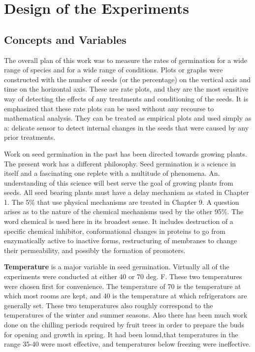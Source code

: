\chapter{Design of the Experiments}

\section{Concepts and Variables}

The overall plan of this work was to measure the rates of germination for a wide
range of species and for a wide range of conditions. Plots or graphs were constructed
with the number of seeds (or the percentage) on the vertical axis and time on the
horizontal axis. These are rate plots, and they are the most sensitive way of detecting
the effects of any treatments and conditioning of the seeds. It is emphasized that these
rate plots can be used without any recourse to mathematical analysis. They can be
treated as empirical plots and used simply as a: delicate sensor to detect internal
changes in the seeds that were caused by any prior treatments.

Work on seed germination in the past has been directed towards growing
plants. The present work has a different philosophy. Seed germination is a science in
itself and a fascinating one replete with a multitude of phenomena. An. understanding
of this science will best serve the goal of growing plants from seeds.
All seed bearing plants must have a delay mechanism as stated in Chapter 1.
The 5\% that use physical mechanisms are treated in Chapter 9. A question arises as
to the nature of the chemical mechanisms used by the other 95\%. The word chemical
is used here in its broadest sense. It includes destruction of a specific chemical
inhibitor, conformational changes in proteins to go from enzymatically active to inactive
forms, restructuring of membranes to change their permeability, and possibly the
formation of promoters.

\textbf{Temperature} is a major variable in seed germination. Virtually all of
the experiments were conducted at either 40 or 70 deg. F. These two
temperatures were chosen first for convenience. The temperature of 70 is the
temperature at which most rooms are kept, and 40 is the temperature at which
refrigerators are generally set.  These two temperatures also roughly
correspond to the temperatures of the winter and summer seasons. Also there has
been much work done on the chilling periods required by fruit trees in order to
prepare the buds for opening and growth in spring. It had been lound,that
temperatures in the range 35-40 were most effective, and temperatures below
freezing were ineffective.

